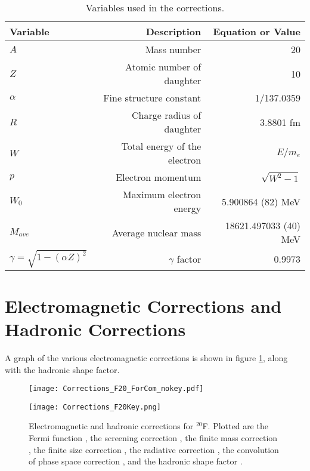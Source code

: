 \documentclass[../MaxHughesThesis.tex]{subfiles}
\begin{document}
\begin{table}[!hbt]
	\centering
	\caption{Variables used in the corrections.}
		\begin{tabular}{lrr}
		\hline \hline Variable & Description & Equation or Value \\ \hline		
		$A$ & Mass number & 20 \\ 
		$Z$ & Atomic number of daughter & 10 \\
		$\alpha$ & Fine structure constant & 1/137.0359\\
		$R$ & Charge radius of daughter & 3.8801 fm \cite{Ang13} \\
		$W$ & Total energy of the electron & $E/m_{e}$ \\
		$p$ & Electron momentum & $\sqrt{W^{2} - 1}$ \\
		$W_{0}$ & Maximum electron energy &  5.900864 (82) MeV \\ 
		$M_{ave}$ & Average nuclear mass &  18621.497033 (40) MeV  \\
		$\gamma = \sqrt{1 - (\alpha Z)^{2}} $ & $\gamma$ factor & 0.9973 \\ \hline \hline
		\end{tabular}
	\label{tab:vars}
\end{table}



\section{Electromagnetic Corrections and Hadronic Corrections}
A graph of the various electromagnetic corrections is shown in figure \ref{fig:corrections}, along with the hadronic shape factor. 

\begin{figure}
    \centering
    \begin{minipage}{0.65\textwidth}
        \centerline{\texttt{[image: Corrections\_F20\_ForCom\_nokey.pdf]}} %
    \end{minipage}\hfill
    \begin{minipage}{0.35\textwidth}
        \centerline{\texttt{[image: Corrections\_F20Key.png]}}
    \end{minipage}
    \caption{Electromagnetic and hadronic corrections for $^{20}$F.
	     Plotted are the Fermi function \cite{Wil89}, the screening correction \cite{Buh84}, the finite mass correction \cite{WIL90}, the finite size correction \cite{WIL90}, the radiative correction \cite{Fay86}, the convolution of phase space correction \cite{WIL90}, and the hadronic shape factor \cite{Cal77}.}
    \label{fig:corrections}
\end{figure}
\end{document}
